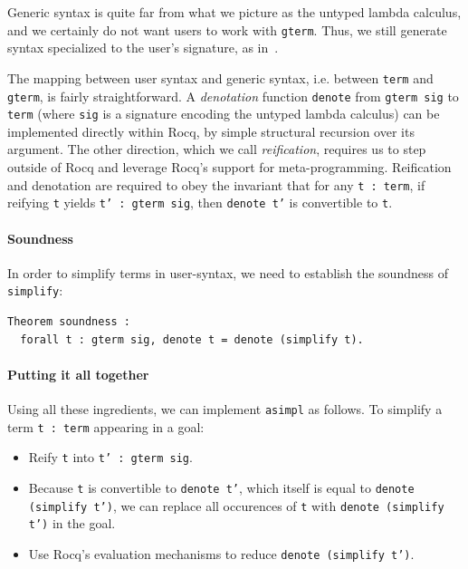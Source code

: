 \documentclass[sigplan,review,anonymous]{acmart}
\newcommand{\coq}[1]{\texttt{#1}}
\begin{document}
Generic syntax is quite far from what we picture as the untyped
lambda calculus, and we certainly
do not want users to work with \coq{gterm}. Thus, we still generate
syntax specialized to the user's signature, as in~.

The mapping between user syntax and generic syntax, i.e. between \coq{term}
and \coq{gterm}, is fairly straightforward.
A \textit{denotation} function
\coq{denote} from \coq{gterm sig} to \coq{term} (where \coq{sig} is a signature
encoding the untyped lambda calculus) can be implemented directly within Rocq,
by simple structural recursion over its argument. The other direction,
which we call \textit{reification}, requires us to step outside of Rocq
and leverage Rocq's support for meta-programming. Reification and
denotation are required to
obey the invariant that for any \coq{t : term}, if reifying \coq{t} yields
\coq{t' : gterm sig}, then \coq{denote t'} is convertible to \coq{t}.

\paragraph{Soundness}

In order to simplify terms in user-syntax, we need to establish the
soundness of \coq{simplify}:

\begin{verbatim}
Theorem soundness :
  forall t : gterm sig, denote t = denote (simplify t).
\end{verbatim}

%

\paragraph{Putting it all together}

Using all these ingredients, we can implement \coq{asimpl} as
follows. To simplify a term \coq{t : term} appearing in a goal:
\begin{itemize}
  \item Reify \coq{t} into \coq{t' : gterm sig}.
  \item Because \coq{t} is convertible to \coq{denote t'}, which itself is equal
    to \coq{denote (simplify t')}, we can replace all occurences of
    \coq{t} with \coq{denote (simplify t')} in the goal.
  \item Use Rocq's evaluation mechanisms to reduce \coq{denote (simplify t')}.
\end{itemize}
\end{document}
